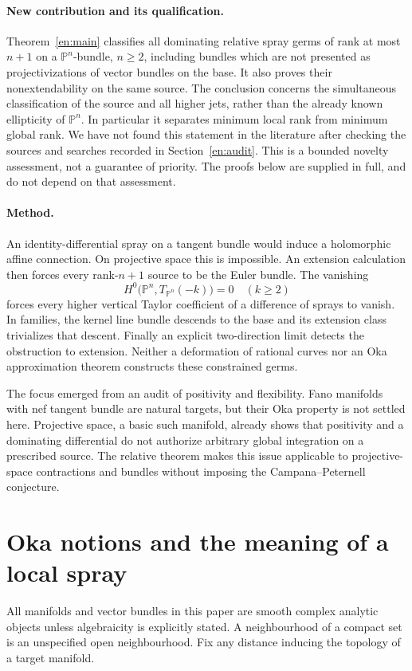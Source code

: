 \documentclass[12pt]{amsart}
\theoremstyle{definition}
\theoremstyle{remark}
\numberwithin{equation}{section}
\newcommand{\mP}{\mathbb{P}}
\begin{document}
\paragraph{New contribution and its qualification.}
Theorem~\ref{en:main} classifies all dominating relative spray germs of rank at most $n+1$ on a $\mP^n$-bundle, $n\geq2$, including bundles which are not presented as projectivizations of vector bundles on the base. It also proves their nonextendability on the same source. The conclusion concerns the simultaneous classification of the source and all higher jets, rather than the already known ellipticity of $\mP^n$. In particular it separates minimum local rank from minimum global rank. We have not found this statement in the literature after checking the sources and searches recorded in Section~\ref{en:audit}. This is a bounded novelty assessment, not a guarantee of priority. The proofs below are supplied in full, and do not depend on that assessment.

\paragraph{Method.}
An identity-differential spray on a tangent bundle would induce a holomorphic affine connection. On projective space this is impossible. An extension calculation then forces every rank-$n+1$ source to be the Euler bundle. The vanishing
\[
H^0\bigl(\mP^n,T_{\mP^n}(-k)\bigr)=0\quad(k\geq2)
\]
forces every higher vertical Taylor coefficient of a difference of sprays to vanish. In families, the kernel line bundle descends to the base and its extension class trivializes that descent. Finally an explicit two-direction limit detects the obstruction to extension. Neither a deformation of rational curves nor an Oka approximation theorem constructs these constrained germs.

The focus emerged from an audit of positivity and flexibility. Fano manifolds with nef tangent bundle are natural targets, but their Oka property is not settled here. Projective space, a basic such manifold, already shows that positivity and a dominating differential do not authorize arbitrary global integration on a prescribed source. The relative theorem makes this issue applicable to projective-space contractions and bundles without imposing the Campana--Peternell conjecture.

\section{Oka notions and the meaning of a local spray}\label{en:notions}
All manifolds and vector bundles in this paper are smooth complex analytic objects unless algebraicity is explicitly stated. A neighbourhood of a compact set is an unspecified open neighbourhood. Fix any distance inducing the topology of a target manifold.
\end{document}

